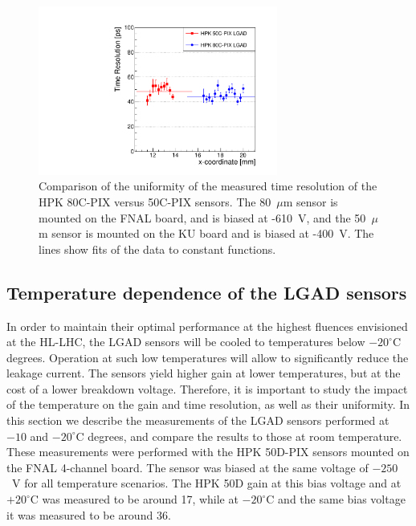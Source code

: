 \documentclass[preprint,1p]{elsarticle}
\begin{document}

\begin{figure}[htbp] 
\centering
\includegraphics[width=0.7\textwidth]{figs/FNAL_TimeResolution_vs_X_HPK50CVs80C_WithFits.pdf} 
\caption{Comparison of the uniformity of the measured time resolution of the HPK 80C-PIX versus 50C-PIX sensors. The 80~$\mu$m sensor is mounted on the FNAL board, and is biased at -610~V, and the 50~$\mu$m sensor is mounted on the KU board and is biased at -400~V. The lines show fits of the data to constant functions.} 
\label{fig:HPK50CVs80C} 
\end{figure} 

\subsection{Temperature dependence of the LGAD sensors}
\label{sec:temp_dependance}

In order to maintain their optimal performance at the highest fluences
envisioned at the HL-LHC, the LGAD sensors will be cooled to temperatures below
$-20^{\circ}$C degrees. Operation at such low temperatures will allow to
significantly reduce the leakage current. The sensors yield higher gain at lower 
temperatures, but at the cost of a lower breakdown voltage. Therefore, it is 
important to study the impact of the temperature on the gain and time 
resolution, as well as their uniformity. In this section we describe the measurements of
the LGAD sensors performed at $-10$ and $-20^{\circ}$C degrees, and compare the
results to those at room temperature. These measurements were performed with the
HPK 50D-PIX sensors mounted on the FNAL 4-channel board. The sensor was biased
at the same voltage of $-250$~V for all temperature scenarios. The HPK 50D gain
at this bias voltage and at $+20^{\circ}$C was measured to be around 17, while at
$-20^{\circ}$C and the same bias voltage it was measured to be around 36.
\end{document}

